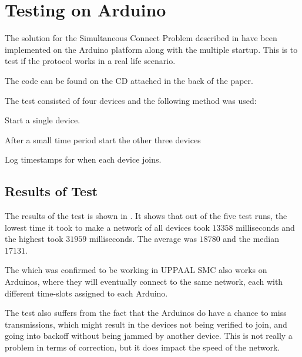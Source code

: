 \section{Testing on Arduino}\label{sec:ccrc_test}
The solution for the Simultaneous Connect Problem described in  have been implemented on the Arduino platform along with the multiple startup.
This is to test if the protocol works in a real life scenario. 

The code can be found on the CD attached in the back of the paper.

The test consisted of four devices and the following method was used:
\begin{eletterate}
	\item Start a single device.
	\item After a small time period start the other three devices
	\item Log timestamps for when each device joins.
\end{eletterate}

\subsection{Results of Test}
The results of the test is shown in .
It shows that out of the five test runs, the lowest time it took to make a network of all devices took $13 358$ milliseconds and the highest took $31 959$ milliseconds.
The average was $18780$ and the median $17131$.

The  which was confirmed to be working in UPPAAL SMC also works on Arduinos, where they will eventually connect to the same network, each with different time-slots assigned to each Arduino.

The test also suffers from the fact that the Arduinos do have a chance to miss transmissions, which might result in the devices not being verified to join, and going into backoff without being jammed by another device.
This is not really a problem in terms of correction, but it does impact the speed of the network.

